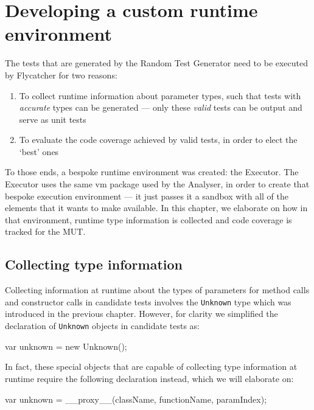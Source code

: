\chapter{Developing a custom runtime environment}
The tests that are generated by the \textsf{Random Test Generator} need to be executed by \textsf{Flycatcher} for two reasons:

\begin{enumerate}
   \item To collect runtime information about parameter types, such that tests with \emph{accurate} types can be generated --- only these \emph{valid} tests can be output and serve as unit tests
   \item To evaluate the code coverage achieved by valid tests, in order to elect the `best' ones
\end{enumerate}

To those ends, a bespoke runtime environment was created: the \textsf{Executor}. The \textsf{Executor} uses the same \textsf{vm} package used by the \textsf{Analyser}, in order to create that bespoke execution environment --- it just passes it a sandbox with all of the elements that it wants to make available. In this chapter, we elaborate on how in that environment, runtime type information is collected and code coverage is tracked for the MUT.


\section{Collecting type information}
Collecting information at runtime about the types of parameters for method calls and constructor calls in candidate tests involves the \texttt{Unknown} type which was introduced in the previous chapter. However, for clarity we simplified the declaration of \texttt{Unknown} objects in candidate tests as:

\begin{code}
var unknown = new Unknown();
\end{code}

\noindent In fact, these special objects that are capable of collecting type information at runtime require the following declaration instead, which we will elaborate on:

\begin{code}
var unknown = __proxy__(className, functionName, paramIndex);
\end{code}

